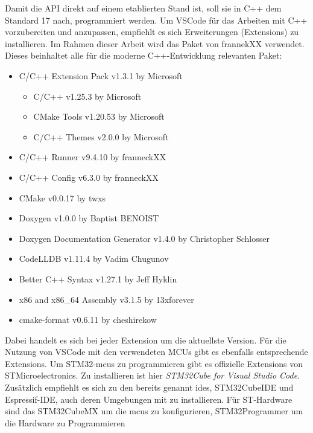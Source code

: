 Damit die API direkt auf einem etablierten Stand ist, soll sie in C++ dem Standard 17 nach, programmiert werden.
Um VSCode für das Arbeiten mit C++ vorzubereiten und anzupassen, empfiehlt es sich Erweiterungen (Extensions) zu installieren.
Im Rahmen dieser Arbeit wird das Paket von frannekXX verwendet.
Dieses beinhaltet alle für die moderne C++-Entwicklung relevanten Paket:
\begin{itemize}
	\item C/C++ Extension Pack  v1.3.1 by Microsoft
	\begin{itemize}
		\item C/C++  v1.25.3  by Microsoft		
		\item CMake Tools  v1.20.53  by Microsoft
		\item C/C++ Themes  v2.0.0 by Microsoft 
	\end{itemize}
	\item C/C++ Runner  v9.4.10 by franneckXX
	\item C/C++ Config  v6.3.0 by franneckXX
	\item CMake  v0.0.17 by twxs
	\item Doxygen  v1.0.0 by Baptist BENOIST
	\item Doxygen Documentation Generator  v1.4.0 by Christopher Schlosser
	\item CodeLLDB  v1.11.4 by Vadim Chugunov
	\item Better C++ Syntax  v1.27.1  by Jeff Hyklin
	\item x86 and x86\_64 Assembly  v3.1.5 by 13xforever
	\item cmake-format  v0.6.11 by cheshirekow
\end{itemize}

Dabei handelt es sich bei jeder Extension um die aktuellste Version.
Für die Nutzung von VSCode mit den verwendeten MCUs gibt es ebenfalls entsprechende Extensions.
Um STM32-\gls{mcu}s zu programmieren gibt es offizielle Extensions von\\STMicroelectronics.
Zu installieren ist hier \emph{STM32Cube for Visual Studio Code}.
Zusätzlich empfiehlt es sich zu den bereits genannt \gls{ide}s, STM32CubeIDE und Espressif-IDE, auch deren Umgebungen mit zu installieren.
Für ST-Hardware sind das STM32CubeMX um die \gls{mcu}s zu konfigurieren, STM32Programmer um die Hardware zu Programmieren %

